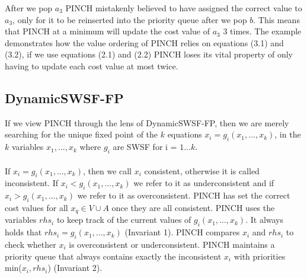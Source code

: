 \begin{center}
\end{center}
After we pop $a_3$ PINCH mistakenly believed to have assigned the correct value to $a_3$, only for it to be reinserted into the priority queue after we pop $b$. This means that PINCH at a minimum will update the cost value of $a_3$ 3 times. The example demonstrates how the value ordering of PINCH relies on equations (3.1) and (3.2), if we use equations (2.1) and (2.2) PINCH loses its vital property of only having to update each cost value at most twice. \cite{main}
\newpage
\subsection{DynamicSWSF-FP}
If we view PINCH through the lens of DynamicSWSF-FP, then we are merely searching for the unique fixed point of the $k$ equations $x_i = g_i(x_1,...,x_k)$, in the $k$ variables $x_1,...,x_k$ where $g_i$ are SWSF for i = $1...k$. \\\\
If $x_i = g_i(x_1,...,x_k)$, then we call $x_i$ consistent, otherwise it is called inconsistent. If $x_i < g_i(x_1,...,x_k)$ we refer to it as underconsistent and if $x_i > g_i(x_1,...,x_k)$ we refer to it as overconsistent. PINCH has set the correct cost values for all $x_q \in V \cup A$ once they are all consistent. PINCH uses the variables $rhs_i$ to keep track of the current values of $g_i(x_1, . . . , x_k)$. It always holds that $rhs_i = g_i(x_1, . . . , x_k)$ (Invariant 1). PINCH compares $x_i$ and $rhs_i$ to check whether $x_i$
is overconsistent or underconsistent. PINCH maintains a priority queue that always contains exactly the inconsistent $x_i$ with priorities min($x_i, rhs_i$) (Invariant 2). \cite{main}\\

